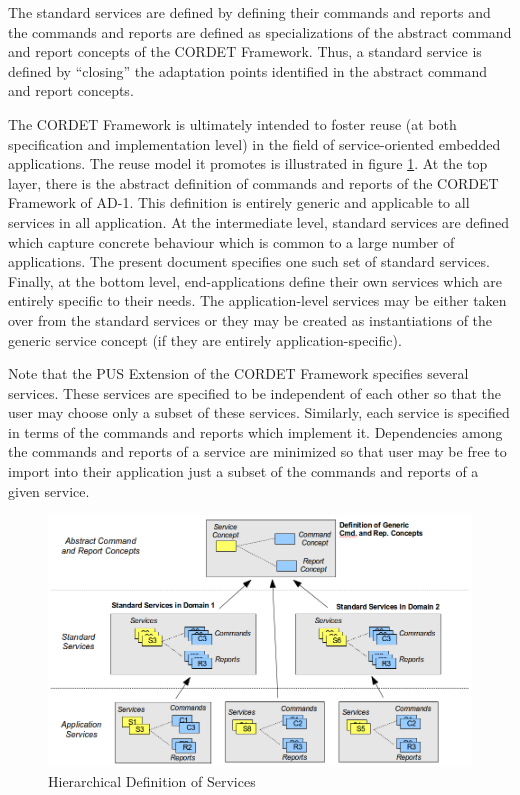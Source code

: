 \documentclass[a4paper,10pt]{article}
\begin{document}
The standard services are defined by defining their commands and reports and the commands and reports are defined as specializations of the abstract command and report concepts of the CORDET Framework. Thus, a standard service is defined by “closing” the adaptation points identified in the abstract command and report concepts.

The CORDET Framework is ultimately intended to foster reuse (at both specification and implementation level) in the field of service-oriented embedded applications. The reuse model it promotes is illustrated in figure \ref{fig:HierarchicalDefServ}. 
At the top layer, there is the abstract definition of commands and reports of the CORDET Framework of AD-1. This definition is entirely generic and applicable to all services in all application. At the intermediate level, standard services are defined which capture concrete behaviour which is common to a large number of applications. The present document specifies one such set of standard services. Finally, at the bottom level, end-applications define their own services which are entirely specific to their needs. The application-level services may be either taken over from the standard services or they may be created as instantiations of the generic service concept (if they are entirely application-specific).

Note that the PUS Extension of the CORDET Framework specifies several services. These services are specified to be independent of each other so that the user may choose only a subset of these services. Similarly, each service is specified in terms of the commands and reports which implement it. Dependencies among the commands and reports of a service are minimized so that user may be free to import into their application just a subset of the commands and reports of a given service.

\begin{figure}[ht]
 \centering
 \includegraphics[scale=0.3,keepaspectratio=true]{HierarchicalDefServ.png}
 \caption{Hierarchical Definition of Services}
 \label{fig:HierarchicalDefServ}
\end{figure}
\end{document}
